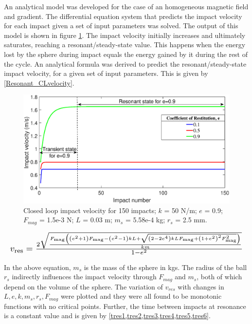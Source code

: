 \documentclass[letterpaper, 10 pt, conference]{ieeeconf}  %
\begin{document}
An analytical model was developed for the case of an homogeneous magnetic field and gradient. The differential equation system that predicts the impact velocity for each impact given a set of input parameters was solved. The output of this model is shown in figure \ref{Closedloop_Impact_velocity}.
The impact velocity initially increases and ultimately saturates, reaching a resonant/steady-state value. This happens when the energy lost by the sphere during impact equals the energy gained by it during the rest of the cycle. An analytical formula was derived to predict the resonant/steady-state impact velocity, for a given set of input parameters. This is given by \cref{Resonant_CLvelocity}.


\begin{figure}
	\includegraphics[width=\linewidth]{Closedloop_Impact_velocity.eps}
	\caption{Closed loop impact velocity for 150 impacts; $k$ = 50 N/m; $e$ = 0.9; $F_{mag}$ = 1.5e-3 N; $L$ = 0.03 m; $m_s$ = 5.58e-4 kg; $r_s$ = 2.5 mm.}
	\label{Closedloop_Impact_velocity}
	
\end{figure}

\begin{equation}
\resizebox{\linewidth}{!}
{$
v_{\text{res}}=\frac{2 \sqrt{\frac{F_{\text{mag}} \left(\left(e^2+1\right) F_{\text{mag}}-\left(e^2-1\right) k L+\sqrt{\left(2-2 e^4\right) k L F_{\text{mag}}+\left(1+e^2\right)^2 F_{\text{mag}}^2}\right)}{k m}}}{1-e^2}
$}
\label{Resonant_CLvelocity}
\end{equation}

In the above equation, $m_s$ is the mass of the sphere in kgs. The radius of the ball $r_s$ indirectly influences the impact velocity through $F_{mag}$ and $m_s$, both of which depend on the volume of the sphere. The variation of $v_{res}$ with changes in $L,e,k,m_s,r_s,F_{mag}$ were plotted and they were all found to be monotonic functions with no critical points. Further, the time between impacts at resonance is a constant value and is given by \cref{tres1,tres2,tres3,tres4,tres5,tres6}.
	
\end{document}
